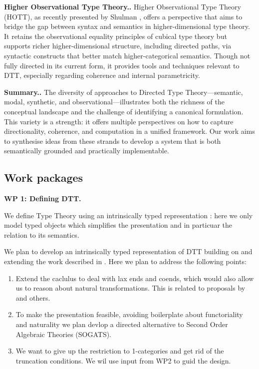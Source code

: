 \documentclass[a4paper,11pt]{article}
\let\oldcite\cite
\renewcommand*\cite[1]{{\protect\NoHyper\oldcite{#1}\protect\endNoHyper}}
\renewcommand{\paragraph}[1]{\textbf{#1.}}
\begin{document}
\paragraph{Higher Observational Type Theory.}
Higher Observational Type Theory (HOTT), as recently presented by
Shulman \cite{shulman2022}, offers a perspective that aims to bridge
the gap between syntax and semantics in higher-dimensional type
theory. It retains the observational equality principles of cubical
type theory but supports richer higher-dimensional structure,
including directed paths, via syntactic constructs that better match
higher-categorical semantics. Though not fully directed in its current
form, it provides tools and techniques relevant to DTT, especially
regarding coherence and internal parametricity.

\paragraph{Summary.}
The diversity of approaches to Directed Type Theory—semantic, modal,
synthetic, and observational—illustrates both the richness of the
conceptual landscape and the challenge of identifying a canonical
formulation. This variety is a strength: it offers multiple
perspectives on how to capture directionality, coherence, and
computation in a unified framework. Our work aims to synthesise ideas
from these strands to develop a system that is both semantically
grounded and practically implementable.

\subsection{Work packages}\label{work-packages}

\paragraph{WP 1: Defining DTT}

We define Type Theory using an intrinsically typed
representation \cite{txa-ambrus-defining}: here we only model typed
objects which simplifies the presentation and in particuar the
relation to its semantics.

We plan to develop an intrinsically typed representation of DTT
building on and extending the work described in
\cite{neumann-phd,altenkirch-neumann}.  Here we plan to address the
following points:
\begin{enumerate}
\item Extend the caclulus to deal with lax ends and coends, which
  would also allow us to reason about natural transformations. This is
  related to proposals by \cite{Paige} and others.
\item To make the presentation feasible, avoiding boilerplate about
  functoriality and naturality we plan devlop a directed alternative
  to Second Order Algebraic Theories (SOGATS).
\item We want to give up the restriction to 1-categories and get rid
  of the truncation conditions. We wil use input from WP2 to guid the design.
\end{enumerate}
\end{document}
